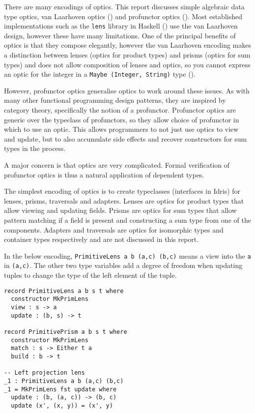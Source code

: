 \documentclass[]{report}
\begin{document}
There are many encodings of optics. This report discusses simple algebraic data type optics, van Laarhoven optics (\cite{laarhoven2011lens}) and profunctor optics (\cite{pickering2017profunctor}). Most established implementations such as the \texttt{lens} library in Haskell (\cite{ekmettlens}) use the van Laarhoven design, however these have many limitations. One of the principal benefits of optics is that they compose elegantly, however the van Laarhoven encoding makes a distinction between lenses (optics for product types) and prisms (optics for sum types) and does not allow composition of lenses and optics, so you cannot express an optic for the integer in a \texttt{Maybe (Integer, String)} type (\cite{pickering2017profunctor}).

However, profunctor optics generalise optics to work around these issues. As with many other functional programming design patterns, they are inspired by category theory, specifically the notion of a profunctor. Profunctor optics are generic over the typeclass of profunctors, so they allow choice of profunctor in which to use an optic. This allows programmers to not just use optics to view and update, but to also accumulate side effects and recover constructors for sum types in the process.

A major concern is that optics are very complicated. Formal verification of profunctor optics is thus a natural application of dependent types.

The simplest encoding of optics is to create typeclasses (interfaces in Idris) for lenses, prisms, traversals and adapters. Lenses are optics for product types that allow viewing and updating fields. Prisms are optics for sum types that allow pattern matching if a field is present and constructing a sum type from one of the components. Adapters and traversals are optics for isomorphic types and container types respectively and are not discussed in this report.

In the below encoding, \texttt{PrimitiveLens a b (a,c) (b,c)} means a view into the \texttt{a} in \texttt{(a,c)}. The other two type variables add a degree of freedom when updating tuples to change the type of the left element of the tuple.

\begin{verbatim}
record PrimitiveLens a b s t where
  constructor MkPrimLens
  view : s -> a
  update : (b, s) -> t

record PrimitivePrism a b s t where
  constructor MkPrimLens
  match : s -> Either t a
  build : b -> t

-- Left projection lens
_1 : PrimitiveLens a b (a,c) (b,c)
_1 = MkPrimLens fst update where
  update : (b, (a, c)) -> (b, c)
  update (x', (x, y)) = (x', y)
\end{verbatim}
\end{document}
